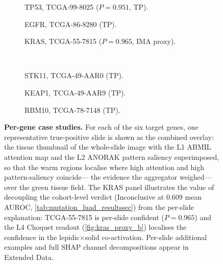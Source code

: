 \begin{figure}[htbp]
  \centering
  \begin{subfigure}[t]{0.32\linewidth}
    \caption{TP53, TCGA-99-8025 ($P=0.951$, TP).}
    \label{fig:case_tp53}
  \end{subfigure}\hfill
  \begin{subfigure}[t]{0.32\linewidth}
    \caption{EGFR, TCGA-86-8280 (TP).}
    \label{fig:case_egfr}
  \end{subfigure}\hfill
  \begin{subfigure}[t]{0.32\linewidth}
    \caption{KRAS, TCGA-55-7815 ($P=0.965$, IMA proxy).}
    \label{fig:case_kras}
  \end{subfigure}\\[1.2ex]
  \begin{subfigure}[t]{0.32\linewidth}
    \caption{STK11, TCGA-49-AAR0 (TP).}
    \label{fig:case_stk11}
  \end{subfigure}\hfill
  \begin{subfigure}[t]{0.32\linewidth}
    \caption{KEAP1, TCGA-49-AAR9 (TP).}
    \label{fig:case_keap1}
  \end{subfigure}\hfill
  \begin{subfigure}[t]{0.32\linewidth}
    \caption{RBM10, TCGA-78-7148 (TP).}
    \label{fig:case_rbm10}
  \end{subfigure}
  \caption{\textbf{Per-gene case studies.} For each of the six
  target genes, one representative true-positive slide is shown as
  the combined \lchai{} overlay: the \ctranspath{} tissue thumbnail
  of the whole-slide image with the L1 ABMIL attention map and the
  L2 ANORAK pattern saliency superimposed, so that the warm regions
  localise where high attention and high pattern-saliency coincide---
  the evidence the aggregator weighed---over the green tissue field.
  The KRAS panel illustrates the value of decoupling the
  cohort-level verdict (Inconclusive at $0.609$ mean AUROC,
  \cref{tab:mutation_luad_resultssec}) from
  the per-slide explanation: TCGA-55-7815 is per-slide confident
  ($P=0.965$) and the L4 Choquet readout (\cref{fig:kras_proxy_b})
  localises the confidence in the lepidic$\times$solid
  co-activation. Per-slide additional examples and full SHAP
  channel decompositions appear in Extended Data.}
  \label{fig:case_grid}
\end{figure}

